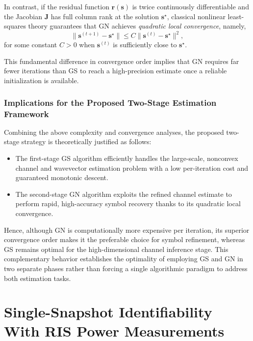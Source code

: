 \documentclass[journal]{IEEEtran}
\begin{document}
In contrast, if the residual function $\mathbf{r}(\mathbf{s})$ is twice continuously differentiable and the Jacobian $\mathbf{J}$ has full column rank at the solution $\mathbf{s}^\star$, classical nonlinear least-squares theory guarantees that GN achieves \emph{quadratic local convergence}, namely,
\begin{equation}
\|
\mathbf{s}^{(t+1)}-\mathbf{s}^\star
\|
\le
C
\|
\mathbf{s}^{(t)}-\mathbf{s}^\star
\|^2,
\end{equation}
for some constant $C>0$ when $\mathbf{s}^{(t)}$ is sufficiently close to $\mathbf{s}^\star$.

This fundamental difference in convergence order implies that GN requires far fewer iterations than GS to reach a high-precision estimate once a reliable initialization is available.

\subsubsection*{Implications for the Proposed Two-Stage Estimation Framework}

Combining the above complexity and convergence analyses, the proposed two-stage strategy is theoretically justified as follows:

\begin{itemize}
\item The first-stage GS algorithm efficiently handles the large-scale, nonconvex channel and wavevector estimation problem with a low per-iteration cost and guaranteed monotonic descent.
\item The second-stage GN algorithm exploits the refined channel estimate to perform rapid, high-accuracy symbol recovery thanks to its quadratic local convergence.
\end{itemize}

Hence, although GN is computationally more expensive per iteration, its superior convergence order makes it the preferable choice for symbol refinement, whereas GS remains optimal for the high-dimensional channel inference stage.  
This complementary behavior establishes the optimality of employing GS and GN in two separate phases rather than forcing a single algorithmic paradigm to address both estimation tasks.


\section{Single-Snapshot Identifiability With RIS Power Measurements}
\label{sec:identifiability}
\end{document}
